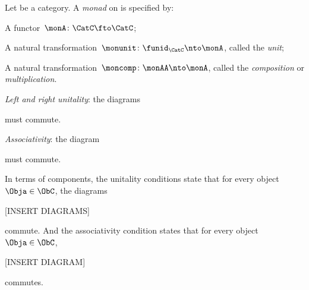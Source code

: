 \begin{ctdefinition}[Monad]
  \label{def:monad}
  Let \CatC be a category. A \emph{monad} on \CatC is specified by:
  \constit
  \begin{compactenum}
    \item A functor~$ \monA \colon \CatC \fto \CatC$;
    \item A natural transformation~$\monunit \colon \funid_\CatC \nto \monA$, called the \emph{unit};
    \item A natural transformation~$\moncomp \colon \monAA \nto \monA$, called the \emph{composition} or \emph{multiplication}.
  \end{compactenum}
  \condit
  \begin{compactenum}
 \item \emph{Left and right unitality}: the diagrams
  \begin{center}
  \end{center}
  must commute. 
  \item \emph{Associativity}: the diagram
  \begin{center}
  \end{center}
  must commute.
  \end{compactenum}
\end{ctdefinition}

\begin{remark}
In terms of components, the unitality conditions state that for every object $\Obja \in \ObC$, the diagrams 

[INSERT DIAGRAMS]

commute. And the associativity condition states that for every object $\Obja \in \ObC$, 

[INSERT DIAGRAM]

commutes. 
\end{remark}






\begin{exercise}
\end{exercise}
\begin{solution}
\end{solution}


